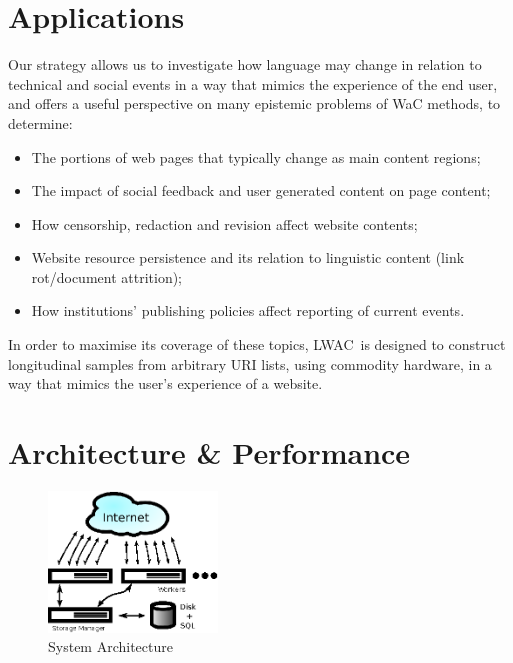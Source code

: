 \documentclass[11pt]{article}
\newcommand{\toolname}{LWAC}
\begin{document}
\section{Applications}
Our strategy allows us to investigate how language may change in relation to technical and social events in a way that mimics the experience of the end user, and offers a useful perspective on many epistemic problems of WaC methods, to determine:

\begin{itemize}
    \item The portions of web pages that typically change as main content regions;
        \vspace{-6pt}
    \item The impact of social feedback and user generated content on page content;
        \vspace{-6pt}
    \item How censorship, redaction and revision affect website contents;
        \vspace{-6pt}
    \item Website resource persistence and its relation to linguistic content (link rot/document attrition);
        \vspace{-6pt}
    \item How institutions' publishing policies affect reporting of current events.
\end{itemize}

In order to maximise its coverage of these topics, \toolname~is designed to construct longitudinal samples from arbitrary URI lists, using commodity hardware, in a way that mimics the user's experience of a website.  



\section{Architecture \& Performance}

\begin{figure}[h]
\centering
\includegraphics[width=0.4\textwidth]{images/arch.eps}
\caption{System Architecture}
\label{fig:arch}
\end{figure}
\end{document}
